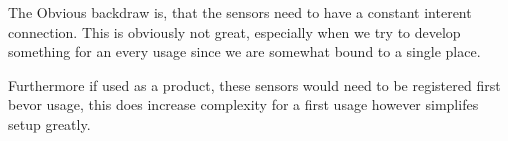 The Obvious backdraw is, that the sensors need to have a constant interent connection. This is obviously not great, especially when we try to develop something for an every usage since we are somewhat bound to a single place. 

Furthermore if used as a product, these sensors would need to be registered first bevor usage, this does increase complexity for a first usage however simplifes setup greatly.





